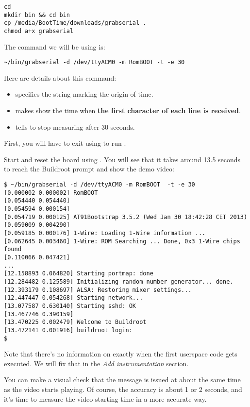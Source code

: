 \begin{verbatim}
cd
mkdir bin && cd bin
cp /media/BootTime/downloads/grabserial .
chmod a+x grabserial
\end{verbatim}

The command we will be using is:

\begin{verbatim}
~/bin/grabserial -d /dev/ttyACM0 -m RomBOOT -t -e 30
\end{verbatim}

Here are details about this command:

\begin{itemize}
\item {} specifies the string marking the
origin of time.
\item {} makes  show the time when 
{\bf the first character of each line is received}.
\item {} tells  to stop measuring after 30
seconds.
\end{itemize}

First, you will have to exit  using  to run
.

Start  and reset the board using . You will
see that it takes around 13.5 seconds to reach the Buildroot prompt and
show the demo video: 

\begin{verbatim}
$ ~/bin/grabserial -d /dev/ttyACM0 -m RomBOOT  -t -e 30
[0.000002 0.000002] RomBOOT
[0.054440 0.054440] 
[0.054594 0.000154] 
[0.054719 0.000125] AT91Bootstrap 3.5.2 (Wed Jan 30 18:42:28 CET 2013)
[0.059009 0.004290] 
[0.059185 0.000176] 1-Wire: Loading 1-Wire information ...
[0.062645 0.003460] 1-Wire: ROM Searching ... Done, 0x3 1-Wire chips
found
[0.110066 0.047421] 
...
[12.158893 0.064820] Starting portmap: done
[12.284482 0.125589] Initializing random number generator... done.
[12.393179 0.108697] ALSA: Restoring mixer settings...
[12.447447 0.054268] Starting network...
[13.077587 0.630140] Starting sshd: OK
[13.467746 0.390159] 
[13.470225 0.002479] Welcome to Buildroot
[13.472141 0.001916] buildroot login:
$ 
\end{verbatim}

Note that there's no information on exactly when the first userspace
code gets executed. We will fix that in the {\em Add instrumentation}
section.  

You can make a visual check that the  message is issued at about the same time as the video
starts playing. Of course, the accuracy is about 1 or 2 seconds,
and it's time to measure the video starting time in a more accurate way.

